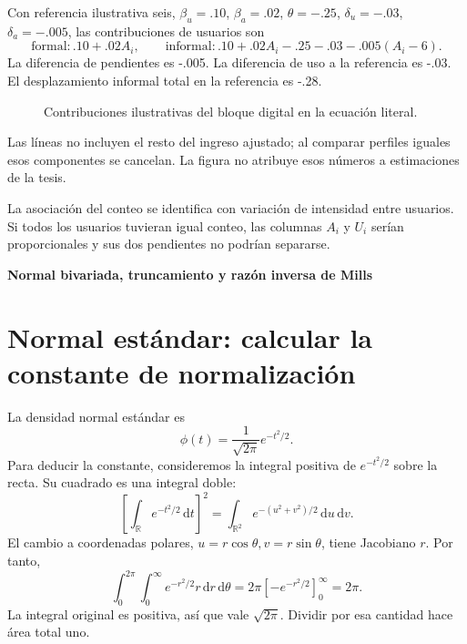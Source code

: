\documentclass[11pt,a4paper]{article}
\newcommand{\dd}{\,\mathrm d}
\begin{document}
Con referencia ilustrativa seis, $\beta_u=.10$, $\beta_a=.02$, $\theta=-.25$, $\delta_u=-.03$, $\delta_a=-.005$, las contribuciones de usuarios son
\[
\text{formal}: .10+.02A_i,\qquad
\text{informal}: .10+.02A_i-.25-.03-.005(A_i-6).
\]
La diferencia de pendientes es -.005. La diferencia de uso a la referencia es -.03. El desplazamiento informal total en la referencia es -.28.
\begin{figure}[H]\centering{}\caption{Contribuciones ilustrativas del bloque digital en la ecuación literal.}\end{figure}

Las líneas no incluyen el resto del ingreso ajustado; al comparar perfiles iguales esos componentes se cancelan. La figura no atribuye esos números a estimaciones de la tesis.

La asociación del conteo se identifica con variación de intensidad entre usuarios. Si todos los usuarios tuvieran igual conteo, las columnas $A_i$ y $U_i$ serían proporcionales y sus dos pendientes no podrían separarse.

\clearpage
{}
{\large\bfseries\color{azul}Normal bivariada, truncamiento y razón inversa de Mills}\par\vspace{2mm}
\section{Normal estándar: calcular la constante de normalización}

La densidad normal estándar es
\[
\phi(t)=\frac1{\sqrt{2\pi}}e^{-t^2/2}.
\]
Para deducir la constante, consideremos la integral
positiva de \(e^{-t^2/2}\) sobre la recta.
Su cuadrado es una integral doble:
\[
\left[\int_{\mathbb R}e^{-t^2/2}\dd t\right]^2
=\int_{\mathbb R^2}e^{-(u^2+v^2)/2}\dd u\dd v.
\]
El cambio a coordenadas polares,
\(u=r\cos\theta,v=r\sin\theta\),
tiene Jacobiano \(r\). Por tanto,
\[
\int_0^{2\pi}\int_0^\infty e^{-r^2/2}r\dd r\dd\theta
=2\pi[-e^{-r^2/2}]_0^\infty=2\pi.
\]
La integral original es positiva,
así que vale \(\sqrt{2\pi}\).
Dividir por esa cantidad hace área total uno.
\end{document}
